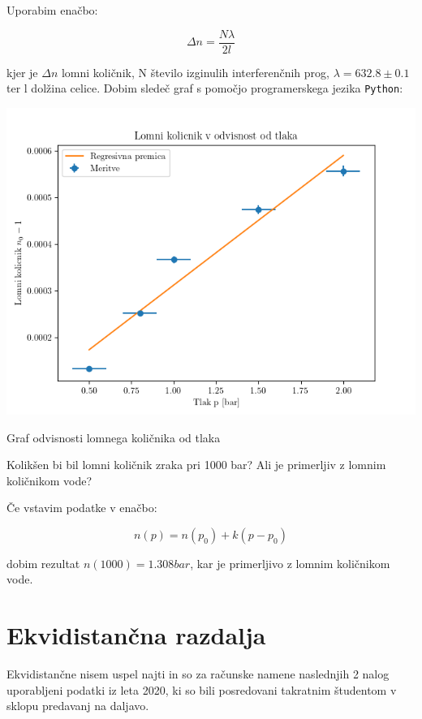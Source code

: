 \documentclass[12pt]{report}
\begin{document}
Uporabim enačbo: 

\begin{equation}
  \Delta n = \frac{N \lambda}{2 l}
\end{equation}

kjer je $\Delta n$ lomni količnik, N število izginulih interferenčnih prog, $\lambda = 632.8\pm0.1$ ter l dolžina celice. 
Dobim sledeč graf s pomočjo programerskega jezika \verb+Python+: 

\begin{slika}[H]
  \centering
  \includegraphics{02}
  \caption{\small Graf odvisnosti lomnega količnika od tlaka}
  \label{fig:graf1}
\end{slika}

Kolikšen bi bil lomni količnik zraka pri 1000 bar? Ali je primerljiv z lomnim količnikom vode?

Če vstavim podatke v enačbo: 

\begin{equation}
  n(p) = n(p_0) + k(p - p_0)
\end{equation}

dobim rezultat $n(1000) = 1.308bar$, kar je primerljivo z lomnim količnikom vode. 

\section*{Ekvidistančna razdalja}

Ekvidistančne nisem uspel najti in so za računske namene naslednjih 2 nalog uporabljeni podatki iz leta 2020, ki so bili posredovani takratnim študentom v sklopu predavanj na daljavo. 
\end{document}
